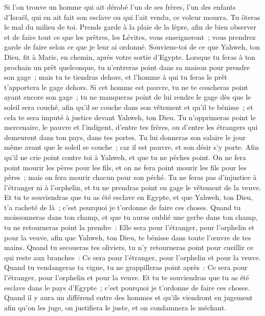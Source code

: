 \begin{multicols}{2}
Si l'on trouve un homme qui ait dérobé l'un de ses frères, l'un des enfants d'Israël, qui en ait fait son esclave ou qui l'ait vendu, ce voleur mourra. Tu ôteras le mal du milieu de toi.
Prends garde à la plaie de la lèpre, afin de bien observer et de faire tout ce que les prêtres, les Lévites, vous enseigneront~; vous prendrez garde de faire selon ce que je leur ai ordonné.
Souviens-toi de ce que Yahweh, ton Dieu, fit à Marie, en chemin, après votre sortie d'Egypte.
Lorsque tu feras à ton prochain un prêt quelconque, tu n'entreras point dans sa maison pour prendre son gage~;
mais tu te tiendras dehors, et l'homme à qui tu feras le prêt t'apportera le gage dehors.
Si cet homme est pauvre, tu ne te coucheras point ayant encore son gage~;
tu ne manqueras point de lui rendre le gage dès que le soleil sera couché, afin qu'il se couche dans son vêtement et qu'il te bénisse~; et cela te sera imputé à justice devant Yahweh, ton Dieu.
Tu n'opprimeras point le mercenaire, le pauvre et l'indigent, d'entre tes frères, ou d'entre les étrangers qui demeurent dans ton pays, dans tes portes.
Tu lui donneras son salaire le jour même avant que le soleil se couche~; car il est pauvre, et son désir s'y porte. Afin qu'il ne crie point contre toi à Yahweh, et que tu ne pèches point.
On ne fera point mourir les pères pour les fils, et on ne fera point mourir les fils pour les pères~; mais on fera mourir chacun pour son péché.
Tu ne feras pas d'injustice à l'étranger ni à l'orphelin, et tu ne prendras point en gage le vêtement de la veuve.
Et tu te souviendras que tu as été esclave en Egypte, et que Yahweh, ton Dieu, t'a racheté de là~; c'est pourquoi je t'ordonne de faire ces choses.
Quand tu moissonneras dans ton champ, et que tu auras oublié une gerbe dans ton champ, tu ne retourneras point la prendre~: Elle sera pour l'étranger, pour l'orphelin et pour la veuve, afin que Yahweh, ton Dieu, te bénisse dans toute l'œuvre de tes mains.
Quand tu secoueras tes oliviers, tu n'y retourneras point pour cueillir ce qui reste aux branches~: Ce sera pour l'étranger, pour l'orphelin et pour la veuve.
Quand tu vendangeras ta vigne, tu ne grappilleras point après~: Ce sera pour l'étranger, pour l'orphelin et pour la veuve.
Et tu te souviendras que tu as été esclave dans le pays d'Egypte~; c'est pourquoi je t'ordonne de faire ces choses.
\VerseOne{}Quand il y aura un différend entre des hommes et qu'ils viendront en jugement afin qu'on les juge, on justifiera le juste, et on condamnera le méchant.

\end{multicols}
